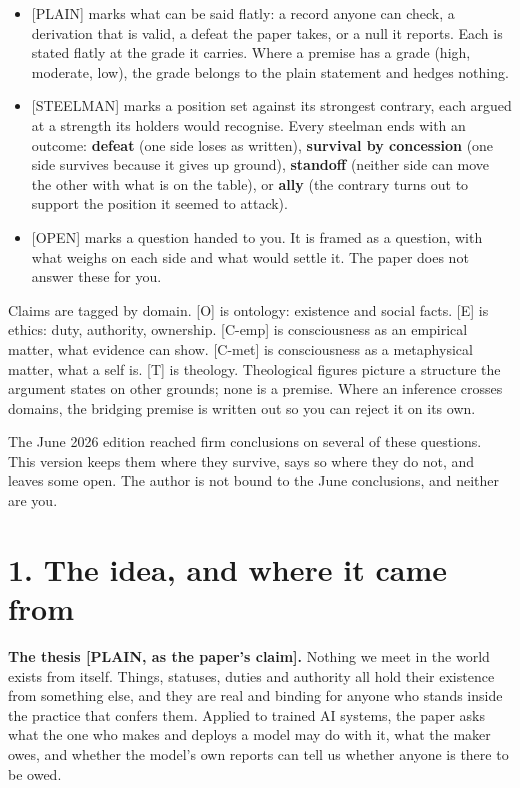 \documentclass[11pt]{article}
\newcommand{\register}[1]{{\ttfamily\small #1}}
\begin{document}
\begin{itemize}
\item \register{[PLAIN]} marks what can be said flatly: a record anyone can check, a derivation that is valid, a defeat the paper takes, or a null it reports. Each is stated flatly at the grade it carries. Where a premise has a grade (high, moderate, low), the grade belongs to the plain statement and hedges nothing.
\item \register{[STEELMAN]} marks a position set against its strongest contrary, each argued at a strength its holders would recognise. Every steelman ends with an outcome: \textbf{defeat} (one side loses as written), \textbf{survival by concession} (one side survives because it gives up ground), \textbf{standoff} (neither side can move the other with what is on the table), or \textbf{ally} (the contrary turns out to support the position it seemed to attack).
\item \register{[OPEN]} marks a question handed to you. It is framed as a question, with what weighs on each side and what would settle it. The paper does not answer these for you.
\end{itemize}
Claims are tagged by domain. [O] is ontology: existence and social facts. [E] is ethics: duty, authority, ownership. [C-emp] is consciousness as an empirical matter, what evidence can show. [C-met] is consciousness as a metaphysical matter, what a self is. [T] is theology. Theological figures picture a structure the argument states on other grounds; none is a premise. Where an inference crosses domains, the bridging premise is written out so you can reject it on its own.

The June 2026 edition reached firm conclusions on several of these questions. This version keeps them where they survive, says so where they do not, and leaves some open. The author is not bound to the June conclusions, and neither are you.

\section*{1. The idea, and where it came from}

\textbf{The thesis \register{[PLAIN, as the paper's claim]}.} Nothing we meet in the world exists from itself. Things, statuses, duties and authority all hold their existence from something else, and they are real and binding for anyone who stands inside the practice that confers them. Applied to trained AI systems, the paper asks what the one who makes and deploys a model may do with it, what the maker owes, and whether the model's own reports can tell us whether anyone is there to be owed.
\end{document}
